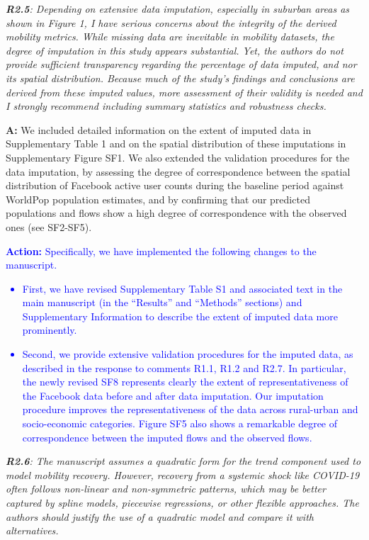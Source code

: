\documentclass[12pt,a4paper,oneside, reqno]{amsart}
\begin{document}
\setlength{\leftskip}{0cm} \textit{\textbf{R2.5}: Depending on extensive data imputation, especially in suburban areas as shown in Figure 1, I have serious concerns about the integrity of the derived mobility metrics. While missing data are inevitable in mobility datasets, the degree of imputation in this study appears substantial. Yet, the authors do not provide sufficient transparency regarding the percentage of data imputed, and nor its spatial distribution. Because much of the study's findings and conclusions are derived from these imputed values, more assessment of their validity is needed and I strongly recommend including summary statistics and robustness checks.}
 
\setlength{\leftskip}{1cm}\textbf{A:} We included detailed information on the extent of imputed data in Supplementary Table 1 and on the spatial distribution of these imputations in Supplementary Figure SF1. We also extended the validation procedures for the data imputation, by assessing the degree of correspondence between the spatial distribution
of Facebook active user counts during the baseline period against WorldPop population estimates, and by confirming that our predicted populations and flows show a high degree of correspondence with the observed ones (see SF2-SF5).

\textcolor{blue}{
\textbf{Action:} Specifically, we have implemented the following changes to the manuscript.
\begin{itemize}[noitemsep, topsep=0pt]
    \item First, we have revised Supplementary Table S1 and associated text in the main manuscript (in the ``Results'' and ``Methods'' sections) and Supplementary Information to describe the extent of imputed data more prominently.
    \item Second, we provide extensive validation procedures for the imputed data, as described in the response to comments R1.1, R1.2 and R2.7. In particular, the newly revised SF8 represents clearly the extent of representativeness of the Facebook data before and after data imputation. Our imputation procedure improves the representativeness of the data across rural-urban and socio-economic categories. Figure SF5 also shows a remarkable degree of correspondence between the imputed flows and the observed flows.
\end{itemize}
}

\setlength{\leftskip}{0cm} \textit{\textbf{R2.6}: The manuscript assumes a quadratic form for the trend component used to model mobility recovery. However, recovery from a systemic shock like COVID-19 often follows non-linear and non-symmetric patterns, which may be better captured by spline models, piecewise regressions, or other flexible approaches. The authors should justify the use of a quadratic model and compare it with alternatives.}
 
\end{document}
